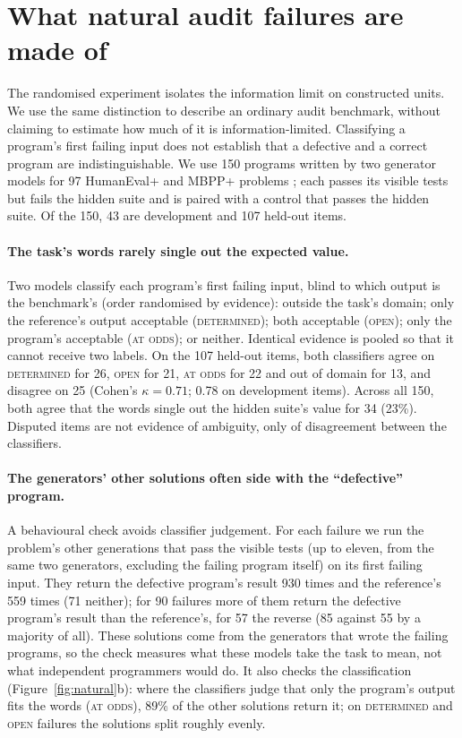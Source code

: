 \section{What natural audit failures are made of}
\label{sec:natural}

The randomised experiment isolates the information limit on constructed units. We use the same distinction to
describe an ordinary audit benchmark, without claiming to estimate how much of it is information-limited.
Classifying a program's first failing input does not establish that a defective and a correct program are
indistinguishable. We use 150 programs written by two generator models for 97 HumanEval+ and MBPP+ problems \citep{liu2023evalplus}; each passes
its visible tests but fails the hidden suite and is paired with a control that passes the hidden suite. Of the 150,
43 are development and 107 held-out items.

\paragraph{The task's words rarely single out the expected value.} Two models classify each program's first failing
input, blind to which output is the benchmark's (order randomised by evidence): outside the task's domain; only the
reference's output acceptable (\textsc{determined}); both acceptable (\textsc{open}); only the program's acceptable
(\textsc{at odds}); or neither. Identical evidence is pooled so that it cannot receive two labels. On the 107 held-out
items, both classifiers agree on \textsc{determined} for 26, \textsc{open} for 21, \textsc{at odds} for 22 and out of
domain for 13, and disagree on 25 (Cohen's $\kappa=0.71$; 0.78 on development items). Across all 150, both agree that
the words single out the hidden suite's value for 34 (23\%). Disputed items are not evidence of ambiguity, only of
disagreement between the classifiers.

\paragraph{The generators' other solutions often side with the ``defective'' program.} A behavioural check avoids
classifier judgement. For each failure we run the problem's other generations that pass the visible tests (up to
eleven, from the same two generators, excluding the failing program itself) on its first failing input. They return
the defective program's result 930 times and the reference's 559 times (71 neither); for 90 failures more of them return
the defective program's result than the reference's, for 57 the reverse (85 against 55 by a majority of all). These solutions come from the generators that wrote the
failing programs, so the check measures what these models take the task to mean, not what independent programmers would do.
It also checks the classification (Figure~\ref{fig:natural}b): where the classifiers judge that only the program's
output fits the words (\textsc{at odds}), 89\% of the other solutions return it; on \textsc{determined} and
\textsc{open} failures the solutions split roughly evenly.

